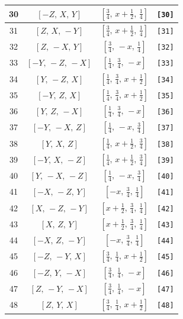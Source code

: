 \documentclass[fleqn,8pt]{jsarticle}
\begin{document}
\begin{longtable}{cccc}
30 & $\left[ - Z,\, X,\, Y \right]$ & $\left[ \frac{3}{4},\, x + \frac{1}{2},\, \frac{1}{4} \right]$ & {\tt [30]} \\ \hline
31 & $\left[ Z,\, X,\, - Y \right]$ & $\left[ \frac{3}{4},\, x + \frac{1}{2},\, \frac{1}{4} \right]$ & {\tt [31]} \\ \hline
32 & $\left[ Z,\, - X,\, Y \right]$ & $\left[ \frac{3}{4},\, - x,\, \frac{1}{4} \right]$ & {\tt [32]} \\ \hline
33 & $\left[ - Y,\, - Z,\, - X \right]$ & $\left[ \frac{1}{4},\, \frac{3}{4},\, - x \right]$ & {\tt [33]} \\ \hline
34 & $\left[ Y,\, - Z,\, X \right]$ & $\left[ \frac{1}{4},\, \frac{3}{4},\, x + \frac{1}{2} \right]$ & {\tt [34]} \\ \hline
35 & $\left[ - Y,\, Z,\, X \right]$ & $\left[ \frac{1}{4},\, \frac{3}{4},\, x + \frac{1}{2} \right]$ & {\tt [35]} \\ \hline
36 & $\left[ Y,\, Z,\, - X \right]$ & $\left[ \frac{1}{4},\, \frac{3}{4},\, - x \right]$ & {\tt [36]} \\ \hline
37 & $\left[ - Y,\, - X,\, Z \right]$ & $\left[ \frac{1}{4},\, - x,\, \frac{3}{4} \right]$ & {\tt [37]} \\ \hline
38 & $\left[ Y,\, X,\, Z \right]$ & $\left[ \frac{1}{4},\, x + \frac{1}{2},\, \frac{3}{4} \right]$ & {\tt [38]} \\ \hline
39 & $\left[ - Y,\, X,\, - Z \right]$ & $\left[ \frac{1}{4},\, x + \frac{1}{2},\, \frac{3}{4} \right]$ & {\tt [39]} \\ \hline
40 & $\left[ Y,\, - X,\, - Z \right]$ & $\left[ \frac{1}{4},\, - x,\, \frac{3}{4} \right]$ & {\tt [40]} \\ \hline
41 & $\left[ - X,\, - Z,\, Y \right]$ & $\left[ - x,\, \frac{3}{4},\, \frac{1}{4} \right]$ & {\tt [41]} \\ \hline
42 & $\left[ X,\, - Z,\, - Y \right]$ & $\left[ x + \frac{1}{2},\, \frac{3}{4},\, \frac{1}{4} \right]$ & {\tt [42]} \\ \hline
43 & $\left[ X,\, Z,\, Y \right]$ & $\left[ x + \frac{1}{2},\, \frac{3}{4},\, \frac{1}{4} \right]$ & {\tt [43]} \\ \hline
44 & $\left[ - X,\, Z,\, - Y \right]$ & $\left[ - x,\, \frac{3}{4},\, \frac{1}{4} \right]$ & {\tt [44]} \\ \hline
45 & $\left[ - Z,\, - Y,\, X \right]$ & $\left[ \frac{3}{4},\, \frac{1}{4},\, x + \frac{1}{2} \right]$ & {\tt [45]} \\ \hline
46 & $\left[ - Z,\, Y,\, - X \right]$ & $\left[ \frac{3}{4},\, \frac{1}{4},\, - x \right]$ & {\tt [46]} \\ \hline
47 & $\left[ Z,\, - Y,\, - X \right]$ & $\left[ \frac{3}{4},\, \frac{1}{4},\, - x \right]$ & {\tt [47]} \\ \hline
48 & $\left[ Z,\, Y,\, X \right]$ & $\left[ \frac{3}{4},\, \frac{1}{4},\, x + \frac{1}{2} \right]$ & {\tt [48]} \\
\end{longtable}
\end{document}
